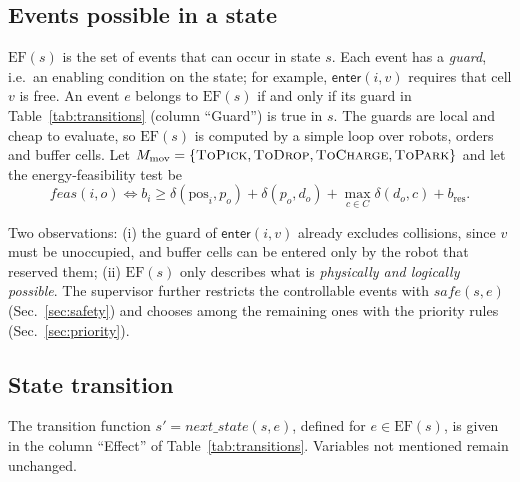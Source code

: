 \documentclass[11pt,a4paper]{article}
\newcommand{\ev}[1]{\mathsf{#1}}            %
\newcommand{\md}[1]{\textsc{#1}}            %
\newcommand{\EF}{\mathrm{EF}}
\newcommand{\pos}{\mathrm{pos}}
\begin{document}
\subsection{Events possible in a state}

$\EF(s)$ is the set of events that can occur in state $s$. Each event has a
\emph{guard}, i.e.\ an enabling condition on the state; for example,
$\ev{enter}(i,v)$ requires that cell $v$ is free. An event $e$ belongs to
$\EF(s)$ if and only if its guard in Table~\ref{tab:transitions} (column
``Guard'') is true in $s$. The guards are
local and cheap to evaluate, so $\EF(s)$ is computed by a simple loop over
robots, orders and buffer cells. Let
$M_{\mathrm{mov}}=\{\md{ToPick},\md{ToDrop},\md{ToCharge},\md{ToPark}\}$ and
let the energy-feasibility test be
\[
  \mathit{feas}(i,o) \iff b_i \ge \delta(\pos_i,p_o)+\delta(p_o,d_o)
  +\max_{c\in C}\delta(d_o,c) + b_{\mathrm{res}} .
\]

Two observations: (i) the guard of $\ev{enter}(i,v)$ already excludes
collisions, since $v$ must be unoccupied, and buffer cells can be entered only
by the robot that reserved them; (ii) $\EF(s)$ only describes what is
\emph{physically and logically possible}. The supervisor further restricts
the controllable events with $\mathit{safe}(s,e)$ (Sec.~\ref{sec:safety}) and
chooses among the remaining ones with the priority rules
(Sec.~\ref{sec:priority}).

\subsection{State transition}

The transition function $s'=\mathit{next\_state}(s,e)$, defined for
$e\in\EF(s)$, is given in the column ``Effect'' of
Table~\ref{tab:transitions}. Variables not mentioned remain unchanged.
\end{document}
